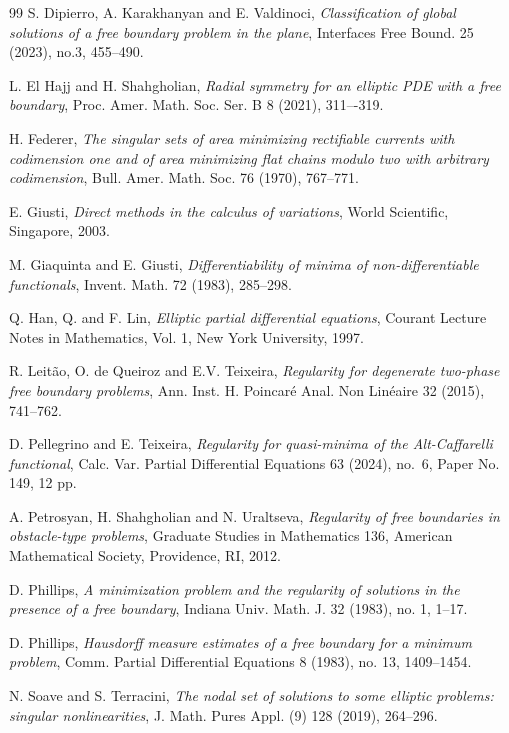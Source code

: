 \documentclass[reqno,11pt]{amsart}
\newcommand{\1}{\mathds{1}}
\numberwithin{equation}{section}
\begin{document}
\begin{thebibliography}{99}
 S. Dipierro, A. Karakhanyan and E. Valdinoci,
{\it Classification of global solutions of a free boundary problem in the plane}, 
Interfaces Free Bound. 25 (2023), no.3, 455--490.

 L. El Hajj and H. Shahgholian,
{\it Radial symmetry for an elliptic PDE with a free boundary},
Proc. Amer. Math. Soc. Ser. B 8 (2021), 311–-319.

 H. Federer, 
{\it The singular sets of area minimizing rectifiable currents with codimension one and of area minimizing flat chains modulo two with arbitrary codimension},  
Bull. Amer. Math. Soc. 76 (1970), 767--771.

 E. Giusti, 
\textit{Direct methods in the calculus of variations}, 
World Scientific, Singapore, 2003.

 M. Giaquinta and E. Giusti, 
{\it Differentiability of minima of non-differentiable functionals}, 
Invent. Math. 72 (1983), 285--298.

 Q. Han, Q. and F. Lin, 
\textit{Elliptic partial differential equations}, 
Courant Lecture Notes in Mathematics, Vol. 1, New York University, 1997.

  R. Leitão, O. de Queiroz and E.V. Teixeira, 
{\it Regularity for degenerate two-phase free boundary problems}, 
Ann. Inst. H. Poincaré Anal. Non Linéaire 32 (2015), 741--762.

 D. Pellegrino and E. Teixeira, 
\textit{Regularity for quasi-minima of the Alt-Caffarelli functional}, 
Calc. Var. Partial Differential Equations 63 (2024), no.~6, Paper No. 149, 12 pp.

 A. Petrosyan, H. Shahgholian and N. Uraltseva, 
{\it Regularity of free boundaries in obstacle-type problems}, 
Graduate Studies in Mathematics 136, American Mathematical Society, Providence, RI, 2012. 

 D. Phillips, 
{\it A minimization problem and the regularity of solutions in the presence of a free boundary}, 
Indiana Univ. Math. J. 32 (1983), no. 1, 1--17.

 D. Phillips, 
{\it Hausdorff measure estimates of a free boundary for a minimum problem},
Comm. Partial Differential Equations 8 (1983), no. 13, 1409--1454.

 N. Soave and S. Terracini,
{\it The nodal set of solutions to some elliptic problems: singular nonlinearities}, 
J. Math. Pures Appl. (9) 128 (2019), 264--296.


\end{thebibliography}
\end{document}

